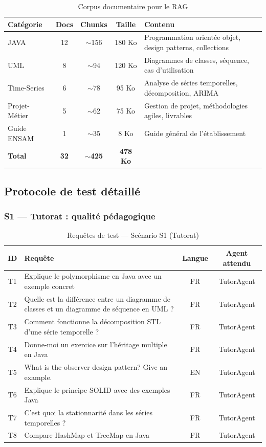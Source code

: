 \documentclass[12pt, a4paper]{article}
\begin{document}
\begin{table}[H]
\centering
\caption{Corpus documentaire pour le RAG}
\label{tab:corpus}
\small
\begin{tabularx}{\textwidth}{l c c c X}
\toprule
\textbf{Catégorie} & \textbf{Docs} & \textbf{Chunks} & \textbf{Taille} & \textbf{Contenu} \\
\midrule
JAVA & 12 & $\sim$156 & 180 Ko & Programmation orientée objet, design patterns, collections \\
UML & 8 & $\sim$94 & 120 Ko & Diagrammes de classes, séquence, cas d'utilisation \\
Time-Series & 6 & $\sim$78 & 95 Ko & Analyse de séries temporelles, décomposition, ARIMA \\
Projet-Métier & 5 & $\sim$62 & 75 Ko & Gestion de projet, méthodologies agiles, livrables \\
Guide ENSAM & 1 & $\sim$35 & 8 Ko & Guide général de l'établissement \\
\midrule
\textbf{Total} & \textbf{32} & $\sim$\textbf{425} & \textbf{478 Ko} & \\
\bottomrule
\end{tabularx}
\end{table}

\subsection{Protocole de test détaillé}

\subsubsection{S1 — Tutorat : qualité pédagogique}

\begin{table}[H]
\centering
\caption{Requêtes de test — Scénario S1 (Tutorat)}
\label{tab:s1_queries}
\small
\begin{tabularx}{\textwidth}{c X c c}
\toprule
\textbf{ID} & \textbf{Requête} & \textbf{Langue} & \textbf{Agent attendu} \\
\midrule
T1 & Explique le polymorphisme en Java avec un exemple concret & FR & TutorAgent \\
T2 & Quelle est la différence entre un diagramme de classes et un diagramme de séquence en UML ? & FR & TutorAgent \\
T3 & Comment fonctionne la décomposition STL d'une série temporelle ? & FR & TutorAgent \\
T4 & Donne-moi un exercice sur l'héritage multiple en Java & FR & TutorAgent \\
T5 & What is the observer design pattern? Give an example. & EN & TutorAgent \\
T6 & Explique le principe SOLID avec des exemples Java & FR & TutorAgent \\
T7 & C'est quoi la stationnarité dans les séries temporelles ? & FR & TutorAgent \\
T8 & Compare HashMap et TreeMap en Java & FR & TutorAgent \\
\bottomrule
\end{tabularx}
\end{table}
\end{document}
